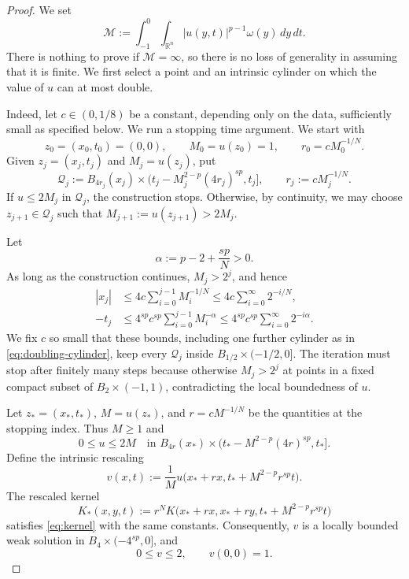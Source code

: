 \documentclass[10pt,a4paper]{amsart}
\newcommand{\R}{\mathbb R}
\begin{document}
\begin{proof}
We set
\[
\mathcal M
:=
\int_{-1}^0\int_{\R^n}
|u(y,t)|^{p-1}\omega(y)\,dy\,dt.
\]
There is nothing to prove if $\mathcal M=\infty$, so there is no loss of generality in assuming that 
it is finite. We first select a point and an intrinsic cylinder on which the value
of $u$ can at most double.

Indeed, let $c\in(0,1/8)$ be a constant, depending only on the data, sufficiently
small as specified below. We run a stopping time argument. We start with
\[
z_0=(x_0,t_0)=(0,0),
\qquad
M_0=u(z_0)=1,
\qquad
r_0=cM_0^{-1/N}.
\]
Given $z_j=(x_j,t_j)$ and $M_j=u(z_j)$, put
\begin{equation}\label{eq:doubling-cylinder}
\mathcal Q_j
:=
B_{4r_j}(x_j)
\times
\bigl(t_j-M_j^{2-p}(4r_j)^{sp},t_j\bigr],
\qquad
r_j:=cM_j^{-1/N}.
\end{equation}
If $u\le2M_j$ in $\mathcal Q_j$, the construction stops. Otherwise, by
continuity, we may choose $z_{j+1}\in\mathcal Q_j$ such that
$M_{j+1}:=u(z_{j+1})>2M_j$.

Let
\[
\alpha:=p-2+\frac{sp}{N}>0.
\]
As long as the construction continues, $M_j>2^j$, and hence
\begin{align*}
|x_j|
&\le
4c\sum_{i=0}^{j-1}M_i^{-1/N}
\le
4c\sum_{i=0}^\infty2^{-i/N},
\\
-t_j
&\le
4^{sp}c^{sp}
\sum_{i=0}^{j-1}M_i^{-\alpha}
\le
4^{sp}c^{sp}
\sum_{i=0}^\infty2^{-i\alpha}.
\end{align*}
We fix $c$ so small that these bounds, including one further cylinder as in
\eqref{eq:doubling-cylinder}, keep every $\mathcal Q_j$ inside
$B_{1/2}\times(-1/2,0]$. The iteration must stop after finitely many steps
because otherwise $M_j>2^j$ at points in a fixed compact subset of
$B_2\times(-1,1)$, contradicting the local boundedness of $u$.

Let $z_*=(x_*,t_*)$, $M=u(z_*)$, and $r=cM^{-1/N}$ be the quantities at the
stopping index. Thus $M\ge1$ and
\begin{equation}\label{eq:doubling-bound}
0\le u\le2M
\quad\text{in }
B_{4r}(x_*)
\times
\bigl(t_*-M^{2-p}(4r)^{sp},t_*\bigr].
\end{equation}
Define the intrinsic rescaling
\begin{equation}\label{eq:moment-rescaling}
v(x,t)
:=
\frac1M
u\bigl(x_*+rx,t_*+M^{2-p}r^{sp}t\bigr).
\end{equation}
The rescaled kernel
\[
K_*(x,y,t)
:=
r^N
K\bigl(x_*+rx,x_*+ry,t_*+M^{2-p}r^{sp}t\bigr)
\]
satisfies \eqref{eq:kernel} with the same constants. Consequently, $v$ is a
locally bounded weak solution in $B_4\times(-4^{sp},0]$, and
\begin{equation}\label{eq:rescaled-local-bounds}
0\le v\le2,
\qquad
v(0,0)=1.
\end{equation}


\end{proof}
\end{document}
